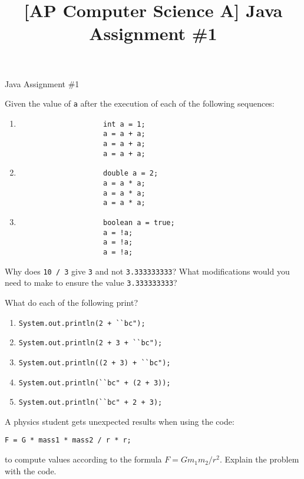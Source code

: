 \documentclass[11pt]{exam}
\title{[AP Computer Science A] Java Assignment \#1}
\newcommand{\AssignmentTitle}{Java Assignment \#1}
\newcommand{\ColorQuestion}[2]{\renewcommand{\questionlabel}{\colorbox{#1}{\color{white}\bfseries\thequestion}\hfill}\question #2}
\newcommand{\BlueQuestion}[1]{\ColorQuestion{RoyalBlue}{#1}}
\newcommand{\GreenQuestion}[1]{\ColorQuestion{ForestGreen}{#1}}
\begin{document}
	\begin{center}
		\Large\AssignmentTitle
	\end{center}

	\begin{questions}
		\BlueQuestion{Given the value of \lstinline{a} after the execution of each of the following sequences:}
		\begin{enumerate}
			\item
				\begin{lstlisting}
					int a = 1;
					a = a + a;
					a = a + a;
					a = a + a;
				\end{lstlisting}

			\item
				\begin{lstlisting}
					double a = 2;
					a = a * a;
					a = a * a;
					a = a * a;
				\end{lstlisting}

			\item
				\begin{lstlisting}
					boolean a = true;
					a = !a;
					a = !a;
					a = !a;
				\end{lstlisting}
		\end{enumerate}

		\BlueQuestion{Why does \lstinline{10 / 3} give \lstinline{3} and not \lstinline{3.333333333}? What modifications would you need to make to ensure the value \lstinline{3.333333333}?}
		
		\GreenQuestion{What do each of the following print?}
		\begin{enumerate}
			\item \lstinline{System.out.println(2 + ``bc");}
			\item \lstinline{System.out.println(2 + 3 + ``bc");}
			\item \lstinline{System.out.println((2 + 3) + ``bc");}
			\item \lstinline{System.out.println(``bc" + (2 + 3));}
			\item \lstinline{System.out.println(``bc" + 2 + 3);}
		\end{enumerate}
		
		\GreenQuestion{A physics student gets unexpected results when using the code:}
		\begin{center}
			\lstinline{F = G * mass1 * mass2 / r * r;}
		\end{center}
		to compute values according to the formula $F = Gm_1m_2/r^2$. Explain the problem with the code.


\end{questions}
\end{document}
